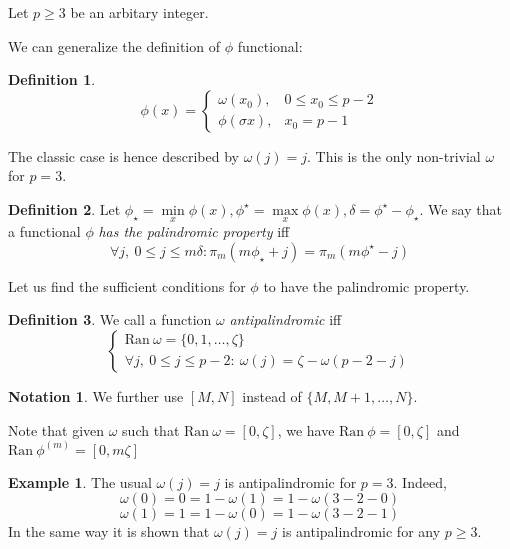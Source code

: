 \documentclass[a4paper]{article}
\theoremstyle{plain}
\theoremstyle{definition}
\newtheorem{definition}{Definition}
\newtheorem*{notation}{Notation}
\newtheorem*{example}{Example}
\begin{document}
Let $p \ge 3$ be an arbitary integer.

We can generalize the definition of $\phi$ functional:
\begin{definition}
    $$
    \phi(x) = \begin{cases}
                    \omega(x_0), & 0 \le x_0 \le p - 2 \\
                    \phi(\sigma x), & x_0 = p - 1
                \end{cases}
    $$
\end{definition}
    The classic case is hence described by $\omega(j)=j$. This is the only non-trivial $\omega$ for $p=3$. \\
    
\begin{definition}
Let $\phi_\star = \min\limits_x \phi(x), \phi^\star = \max\limits_x \phi(x), \delta=\phi^\star - \phi_\star$. We say that a functional $\phi$  \textit{has the palindromic property} iff 
$$
\forall j,\ 0 \le j \le m\delta:   \pi_m(m\phi_\star + j)=\pi_m(m\phi^\star-j)
$$
\end{definition}
    
    Let us find the sufficient conditions for $\phi$ to have the palindromic property.
    
\begin{definition}
We call a function $\omega$  \textit{antipalindromic} iff
\[\begin{cases}
	\mathrm{Ran }\ \omega = \{0,1, \ldots, \zeta\} \\
	\forall j,\ 0 \le j \le p-2: \  \omega(j) = \zeta - \omega(p-2-j)
\end{cases}\]
\end{definition}

\begin{notation}
We further use $[M, N]$ instead of $\{M,M+1, \ldots, N\}$.
\end{notation}

Note that given $\omega$ such that $\mathrm{Ran}\ \omega = [0,\zeta]$, we have $\mathrm{Ran}\ \phi = [0,\zeta]$ and $\mathrm{Ran}\ \phi^{(m)} = [0,m\zeta]$

\begin{example}
The usual $\omega(j)=j$ is antipalindromic for $p = 3$. Indeed,
$$
\omega(0) = 0 = 1 - \omega(1) = 1 - \omega(3 - 2 - 0)
$$
$$
\omega(1) = 1 = 1 - \omega(0) = 1 - \omega(3 - 2 - 1)
$$
In the same way it is shown that $\omega(j)=j$ is antipalindromic for any $p \ge 3$.
\end{example}
\end{document}

